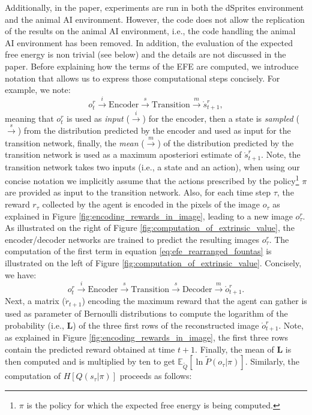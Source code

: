 \documentclass[twoside,11pt]{article}
\begin{document}
Additionally, in the paper, experiments are run in both the dSprites environment and the animal AI environment. However, the code does not allow the replication of the results on the animal AI environment, i.e., the code handling the animal AI environment has been removed. In addition, the evaluation of the expected free energy is non trivial (see below) and the details are not discussed in the paper. Before explaining how the terms of the EFE are computed, we introduce notation that allows us to express those computational steps concisely. For example, we note: 
$$o^r_t \overset{i}{\rightarrow} \text{Encoder} \overset{s}{\rightarrow} \text{Transition} \overset{m}{\rightarrow} \mathring{s}^r_{t+1},$$
meaning that $o^r_t$ is used as \textit{input} ($\overset{i}{\rightarrow}$) for the encoder, then a state is \textit{sampled} ($\overset{s}{\rightarrow}$) from the distribution predicted by the encoder and used as input for the transition network, finally, the \textit{mean} ($\overset{m}{\rightarrow}$) of the distribution predicted by the transition network is used as a maximum aposteriori estimate of $\mathring{s}^r_{t+1}$. Note, the transition network takes two inputs (i.e., a state and an action), when using our concise notation we implicitly assume that the actions prescribed by the policy\footnote{$\pi$ is the policy for which the expected free energy is being computed.} $\pi$ are provided as input to the transition network. Also, for each time step $\tau$, the reward $r_\tau$ collected by the agent is encoded in the pixels of the image $o_\tau$ as explained in Figure \ref{fig:encoding_rewards_in_image}, leading to a new image $o_\tau^r$. As illustrated on the right of Figure \ref{fig:computation_of_extrinsic_value}, the encoder/decoder networks are trained to predict the resulting images $o_\tau^r$. The computation of the first term in equation \eqref{eq:efe_rearranged_fountas} is illustrated on the left of Figure \ref{fig:computation_of_extrinsic_value}. Concisely, we have:
$$o_t^r \overset{i}{\rightarrow} \text{Encoder} \overset{s}{\rightarrow} \text{Transition} \overset{s}{\rightarrow} \text{Decoder} \overset{m}{\rightarrow} \mathring{o}_{t+1}^r.$$
Next, a matrix ($\mathring{r}_{t+1}$) encoding the maximum reward that the agent can gather is used as parameter of Bernoulli distributions to compute the logarithm of the probability (i.e., $\bm{L}$) of the three first rows of the reconstructed image $\mathring{o}_{t+1}^r$. Note, as explained in Figure \ref{fig:encoding_rewards_in_image}, the first three rows contain the predicted reward obtained at time $t+1$. Finally, the mean of $\bm{L}$ is then computed and is multiplied by ten to get $\mathbb{E}_{\tilde{Q}}[\ln \tilde{P}(o_\tau|\pi)]$. Similarly, the computation of $H[Q(s_\tau|\pi)]$ proceeds as follows:
\end{document}
